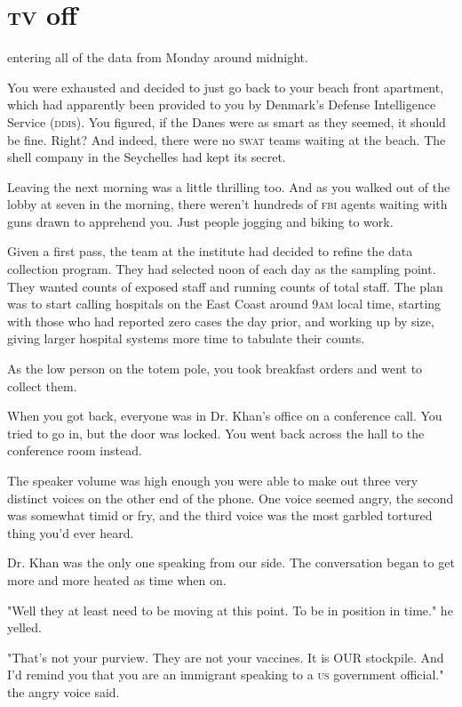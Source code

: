 \documentclass[a5paper, symmetric]{tufte-book}
\begin{document}
\chapter{\textsc{tv} off}
\label{ch:tuesday}

 entering all of the data from Monday around midnight. 

You were exhausted and decided to just go back to your beach front apartment, which had apparently been provided to you by Denmark's Defense Intelligence Service \textsc{(ddis)}. You figured, if the Danes were as smart as they seemed, it should be fine. Right? And indeed, there were no \textsc{swat} teams waiting at the beach. The shell company in the Seychelles had kept its secret. 

Leaving the next morning was a little thrilling too. And as you walked out of the lobby at seven in the morning, there weren't hundreds of \textsc{fbi} agents waiting with guns drawn to apprehend you. Just people jogging and biking to work.

Given a first pass, the team at the institute had decided to refine the data collection program. They had selected noon of each day as the sampling point. They wanted counts of exposed staff and running counts of total staff. The plan was to start calling hospitals on the East Coast around 9\textsc{am} local time, starting with those who had reported zero cases the day prior, and working up by size, giving larger hospital systems more time to tabulate their counts. 

As the low person on the totem pole, you took breakfast orders and went to collect them. 

When you got back, everyone was in Dr. Khan's office on a conference call. You tried to go in, but the door was locked. You went back across the hall to the conference room instead. 

The speaker volume was high enough you were able to make out three very distinct voices on the other end of the phone. One voice seemed angry, the second was somewhat timid or fry, and the third voice was the most garbled tortured thing you'd ever heard.  

Dr. Khan was the only one speaking from our side. The conversation began to get more and more heated as time when on. 

"Well they at least need to be moving at this point. To be in position in time." he yelled. 

"That's not your purview. They are not your vaccines. It is OUR stockpile. And I'd remind you that you are an immigrant speaking to a \textsc{us} government official." the angry voice said. 
\end{document}
